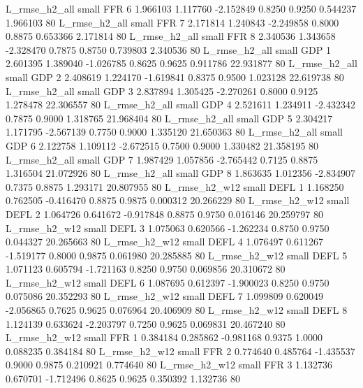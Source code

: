  L_rmse_h2_all      small      FFR                 6 1.966103 1.117760 -2.152849 0.8250 0.9250  0.544237    1.966103 80
 L_rmse_h2_all      small      FFR                 7 2.171814 1.240843 -2.249858 0.8000 0.8875  0.653366    2.171814 80
 L_rmse_h2_all      small      FFR                 8 2.340536 1.343658 -2.328470 0.7875 0.8750  0.739803    2.340536 80
 L_rmse_h2_all      small      GDP                 1 2.601395 1.389040 -1.026785 0.8625 0.9625  0.911786   22.931877 80
 L_rmse_h2_all      small      GDP                 2 2.408619 1.224170 -1.619841 0.8375 0.9500  1.023128   22.619738 80
 L_rmse_h2_all      small      GDP                 3 2.837894 1.305425 -2.270261 0.8000 0.9125  1.278478   22.306557 80
 L_rmse_h2_all      small      GDP                 4 2.521611 1.234911 -2.432342 0.7875 0.9000  1.318765   21.968404 80
 L_rmse_h2_all      small      GDP                 5 2.304217 1.171795 -2.567139 0.7750 0.9000  1.335120   21.650363 80
 L_rmse_h2_all      small      GDP                 6 2.122758 1.109112 -2.672515 0.7500 0.9000  1.330482   21.358195 80
 L_rmse_h2_all      small      GDP                 7 1.987429 1.057856 -2.765442 0.7125 0.8875  1.316504   21.072926 80
 L_rmse_h2_all      small      GDP                 8 1.863635 1.012356 -2.834907 0.7375 0.8875  1.293171   20.807955 80
 L_rmse_h2_w12      small     DEFL                 1 1.168250 0.762505 -0.416470 0.8875 0.9875  0.000312   20.266229 80
 L_rmse_h2_w12      small     DEFL                 2 1.064726 0.641672 -0.917848 0.8875 0.9750  0.016146   20.259797 80
 L_rmse_h2_w12      small     DEFL                 3 1.075063 0.620566 -1.262234 0.8750 0.9750  0.044327   20.265663 80
 L_rmse_h2_w12      small     DEFL                 4 1.076497 0.611267 -1.519177 0.8000 0.9875  0.061980   20.285885 80
 L_rmse_h2_w12      small     DEFL                 5 1.071123 0.605794 -1.721163 0.8250 0.9750  0.069856   20.310672 80
 L_rmse_h2_w12      small     DEFL                 6 1.087695 0.612397 -1.900023 0.8250 0.9750  0.075086   20.352293 80
 L_rmse_h2_w12      small     DEFL                 7 1.099809 0.620049 -2.056865 0.7625 0.9625  0.076964   20.406909 80
 L_rmse_h2_w12      small     DEFL                 8 1.124139 0.633624 -2.203797 0.7250 0.9625  0.069831   20.467240 80
 L_rmse_h2_w12      small      FFR                 1 0.384184 0.285862 -0.981168 0.9375 1.0000  0.088235    0.384184 80
 L_rmse_h2_w12      small      FFR                 2 0.774640 0.485764 -1.435537 0.9000 0.9875  0.210921    0.774640 80
 L_rmse_h2_w12      small      FFR                 3 1.132736 0.670701 -1.712496 0.8625 0.9625  0.350392    1.132736 80
